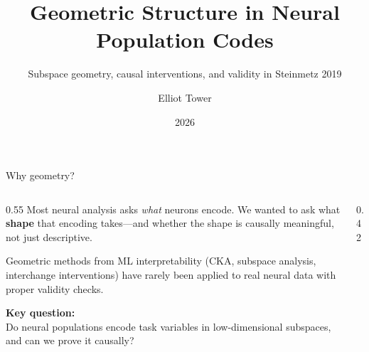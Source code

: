 \documentclass[aspectratio=169,11pt]{beamer}
\title{Geometric Structure in Neural Population Codes}
\subtitle{Subspace geometry, causal interventions, and validity in Steinmetz 2019}
\author{Elliot Tower}
\date{2026}
\institute{}
\begin{document}
\maketitle


\begin{frame}{Why geometry?}
\begin{columns}[T]
\begin{column}{0.55\textwidth}
Most neural analysis asks \emph{what} neurons encode. We wanted to ask what \textbf{shape} that encoding takes---and whether the shape is causally meaningful, not just descriptive.

Geometric methods from ML interpretability (CKA, subspace analysis, interchange interventions) have rarely been applied to real neural data with proper validity checks.

\vspace{1em}
\textbf{Key question:} \\
Do neural populations encode task variables in low-dimensional subspaces, and can we prove it causally?
\end{column}
\begin{column}{0.42\textwidth}
\end{column}
\end{columns}
\end{frame}
\end{document}
